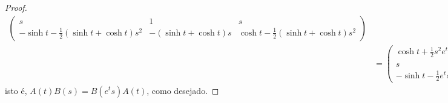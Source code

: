 \begin{proof}
\begin{align*}
\begin{pmatrix}
                     s & 1 & s\\
                     -\sinh{t} - \frac12(\sinh{t} + \cosh{t})s^2 & -(\sinh{t} + \cosh{t})s & \cosh{t} - \frac12(\sinh{t} + \cosh{t})s^2
                 \end{pmatrix}\\
                 &= \begin{pmatrix}
                     \cosh{t} + \frac12s^2e^t & e^ts & \frac12e^ts - \sinh{t}\\
                     s & 1 & s\\
                     -\sinh{t} - \frac12 e^ts^2 & -e^ts & \cosh{t} - \frac12 e^t s^2
                 \end{pmatrix},
    \end{align*}
    isto é, \(A(t)B(s) = B(e^ts)A(t)\), como desejado.
\end{proof}

